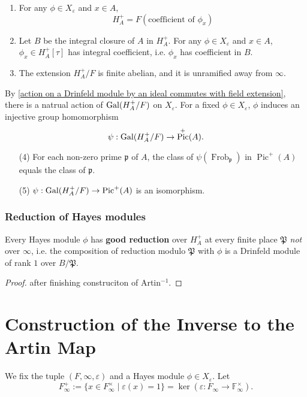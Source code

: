 \documentclass{article}
\newcommand{\F}{\mathbb{F}}
\DeclareMathOperator{\pic}{Pic}
\DeclareMathOperator{\frob}{Frob}
\begin{document}
\begin{theorem}\label{property of HA+}
\begin{enumerate}[(1)]
    \item For any $\phi\in X_\varepsilon$ and $x\in A$,
    \[H_A^+ = F\left( \text{coefficient of }\phi_x \right)\]
    \item Let $B$ be the integral closure of $A$ in $H_A^+$.
    For any $\phi\in X_\varepsilon$ and $x\in A$, $\phi_x\in H_A^+[\tau]$ has integral coefficient, i.e. $\phi_x$ has coefficient in $B$.
    \item The extension $H_A^+/F$ is finite abelian, and it is unramified away from $\infty$.
\end{enumerate}
By \cref{action on a Drinfeld module by an ideal commutes with field extension},
there is a natrual action of $\operatorname{Gal}(H_A^+/F)$ on $X_\varepsilon$.
For a fixed $\phi\in X_\varepsilon$,
$\phi$ induces an injective group homomorphism
\[\psi : \gal(H_A^+/F)\to \pic^+(A).\]
\begin{enumerate}[(1)]
    \item[(4)] For each non-zero prime $\mathfrak{p}$ of $A$,
    the class of $\psi(\frob_\mathfrak{p})$ in $\pic^+(A)$ equals the class of $\mathfrak{p}$.
    \item[(5)] $\psi : \gal(H_A^+/F)\to \pic^+(A)$ is an isomorphism.
\end{enumerate}

\end{theorem}

\subsubsection{Reduction of Hayes modules}

\begin{corollary}\label{Hayes modules have good reduction away from infty}
    Every Hayes module $\phi$ has \textbf{good reduction} over $H_A^+$ at every finite place $\mathfrak{P}$ \textit{not} over $\infty$, i.e. the composition of reduction modulo $\mathfrak{P}$ with $\phi$ is a Drinfeld module of rank $1$ over $B/\mathfrak{P}$.
\end{corollary}
\begin{proof}
    \color{red} after finishing construciton of Artin$^{-1}$.
\end{proof}






\section{Construction of the Inverse to the Artin Map}
We fix the tuple $(F, \infty, \varepsilon)$
and a Hayes module $\phi\in X_\varepsilon$.
Let \[F_\infty^+ := \{x\in F_\infty^\times\mid \varepsilon(x) = 1\} = \ker(\varepsilon : F_\infty\to \F_\infty^\times).\]
\end{document}
